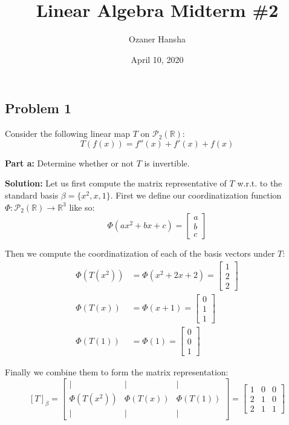 \documentclass{article}
\begin{document}
\title{Linear Algebra Midterm \#2}
\author{Ozaner Hansha}
\date{April 10, 2020}
\maketitle

\subsection*{Problem 1}
Consider the following linear map $T$ on $\mathcal P_2(\mathbb R)$:
$$T(f(x))=f''(x)+f'(x)+f(x)$$
\medskip

\noindent\textbf{Part a:} Determine whether or not $T$ is invertible.
\bigskip

\noindent\textbf{Solution:} Let us first compute the matrix representative of $T$ w.r.t. to the standard basis $\beta=\{x^2,x,1\}$. First we define our coordinatization function $\Phi:\mathcal P_2(\mathbb R)\to \mathbb R^3$ like so:
$$\Phi(ax^2+bx+c)=\begin{bmatrix}
  a\\b\\c
\end{bmatrix}$$

Then we compute the coordinatization of each of the basis vectors under $T$:
\begin{align*}
  \Phi(T(x^2))&=\Phi(x^2+2x+2)=\begin{bmatrix}
    1\\2\\2
  \end{bmatrix}\\
  \Phi(T(x))&=\Phi(x+1)=\begin{bmatrix}
    0\\1\\1
  \end{bmatrix}\\
  \Phi(T(1))&=\Phi(1)=\begin{bmatrix}
    0\\0\\1
  \end{bmatrix}
\end{align*}

Finally we combine them to form the matrix representation:
$$[T]_\beta=\begin{bmatrix}
  \vert & \vert & \vert\\
  \Phi(T(x^2)) & \Phi(T(x)) & \Phi(T(1)) \\
  \vert & \vert & \vert
\end{bmatrix}=\begin{bmatrix}
  1&0&0\\2&1&0\\2&1&1
\end{bmatrix}$$
\end{document}
